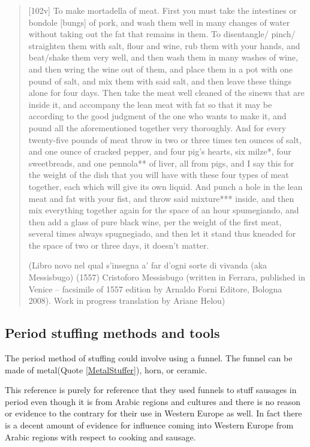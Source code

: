 \documentclass[letterpaper,11pt,leqno]{article}
\begin{document}
 \begin{quote}
 	[102v] To make mortadella of meat.
 	First you must take the intestines or bondole [bungs] of pork, and wash them well in many changes of water without taking out the fat that remains in them.  To disentangle/ pinch/ straighten them with salt, flour and wine, rub them with your hands, and beat/shake them very well, and then wash them in many washes of wine, and then wring the wine out of them, and place them in a pot with one pound of salt, and mix them with said salt, and then leave these things alone for four days.  Then take the meat well cleaned of the sinews that are inside it, and accompany the lean meat with fat so that it may be according to the good judgment of the one who wants to make it, and pound all the aforementioned together very thoroughly.  And for every twenty-five pounds of meat throw in two or three times ten ounces of salt, and one ounce of cracked pepper, and four pig’s hearts, six milze*, four sweetbreads, and one pennola** of liver, all from pigs, and I say this for the weight of the dish that you will have with these four types of meat together, each which will give its own liquid.  And punch a hole in the lean meat and fat with your fist, and throw said mixture*** inside, and then mix everything together again for the space of an hour spumegiando, and then add a glass of pure black wine, per the weight of the first meat, several times always spugnegiado, and then let it stand thus kneaded for the space of two or three days, it doesn’t matter. 
 	
 	(Libro novo nel qual s’insegna a’ far d’ogni sorte di vivanda (aka Messisbugo) (1557) Cristoforo Messisbugo (written in Ferrara, published in Venice -- facsimile of 1557 edition by Arnaldo Forni Editore, Bologna 2008). Work in progress translation by Ariane Helou)
 \end{quote}

\FloatBarrier

\subsection{Period stuffing methods and tools} 

The period method of stuffing could involve using a funnel. The funnel can be made of metal(Quote \ref{MetalStuffer}), horn, or ceramic.

This reference is purely for reference that they used funnels to stuff sausages in period even though it is from Arabic regions and cultures and there is no reason or evidence to the contrary for their use in Western Europe as well. In fact there is a decent amount of evidence for influence coming into Western Europe from Arabic regions with respect to cooking and sausage.
\end{document}
